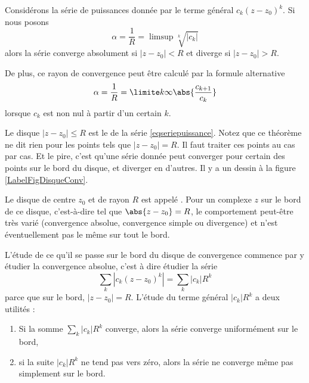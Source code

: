 \begin{theorem}		\label{ThoSerPuissRap}
Considérons la série de puissances donnée par le terme général $c_k(z-z_0)^k$. Si nous posons
\begin{equation}		\label{EqRayCOnvSer}
	\alpha=\frac{1}{ R } =\limsup\sqrt[k]{| c_k |}
\end{equation}
alors la série converge absolument si $| z-z_0 |<R$ et diverge si $| z-z_0 |>R$.

De plus, ce rayon de convergence peut être calculé par la formule alternative 
\begin{equation}		\label{EqAlphaSerPuissAtern}
	\alpha=\frac{1}{ R }=\limite k \infty \abs{\frac{c_{k+1}}{c_k}}
\end{equation}
lorsque $c_k$ est non nul à partir d'un certain $k$.
\end{theorem}
Le disque $| z-z_0 |\leq R$ est le  de la série \eqref{eqseriepuissance}. Notez que ce théorème ne dit rien pour les points tels que $| z-z_0 |=R$. Il faut traiter ces points au cas par cas. Et le pire, c'est qu'une série donnée peut converger pour certain des points sur le bord du disque, et diverger en d'autres.  Il y a un dessin à la figure \ref{LabelFigDisqueConv}.
\newcommand{\CaptionFigDisqueConv}{À l'intérieur du disque de convergence, la convergence est absolue. En dehors, la série diverge. Sur le cercle proprement dit, tout peut arriver.}


Le disque de centre $z_0$ et de rayon $R$ est appelé . Pour un complexe $z$ sur le bord de ce disque, c'est-à-dire tel que $\abs{z-z_0} = R$, le comportement peut-être très varié (convergence absolue, convergence simple ou divergence) et n'est éventuellement pas le même sur tout le bord.

L'étude de ce qu'il se passe sur le bord du disque de convergence commence par y étudier la convergence absolue, c'est à dire étudier la série
\begin{equation}
	\sum_k| c_k(z-z_0)^k |=\sum_k| c_k |R^k
\end{equation}
parce que sur le bord, $| z-z_0 |=R$. L'étude du terme général $| c_k |R^k$ a deux utilités :
\begin{enumerate}
\item Si la somme $\sum_{k}| c_k |R^k$ converge, alors la série converge uniformément sur le bord,
\item si la suite $| c_k |R^k$ ne tend pas vers zéro, alors la série ne converge même pas simplement sur le bord.
\end{enumerate}

